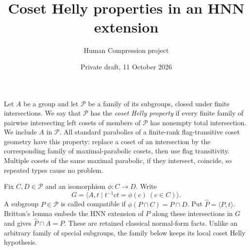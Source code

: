 
\title{Coset Helly properties in an HNN extension}
\author{Human Compression project}
\date{Private draft, 11 October 2026}

\maketitle

Let $A$ be a group and let $\mathcal P$ be a family of its subgroups,
closed under finite intersections. We say that $\mathcal P$ has the
\emph{coset Helly property} if every finite family of pairwise intersecting
left cosets of members of $\mathcal P$ has nonempty total intersection.
We include $A$ in $\mathcal P$. All standard parabolics of a finite-rank
flag-transitive coset geometry have this property: replace a coset of
an intersection by the corresponding family of maximal-parabolic cosets,
then use flag transitivity. Multiple cosets of the same maximal parabolic,
if they intersect, coincide, so repeated types cause no problem.

Fix $C,D\in\mathcal P$ and an isomorphism $\phi:C\longrightarrow D$.
Write
\[
 G=\langle A,t\mid t^{-1}ct=\phi(c)\ (c\in C)\rangle.
\]
A subgroup $P\in\mathcal P$ is called compatible if
$\phi(P\cap C)=P\cap D$. Put $\widehat P=\langle P,t\rangle$.
Britton's lemma embeds the HNN extension of $P$ along these intersections
in $G$ and gives $\widehat P\cap A=P$. These are retained classical
normal-form facts. Unlike an arbitrary family of special subgroups, the
family below keeps its local coset Helly hypothesis.

